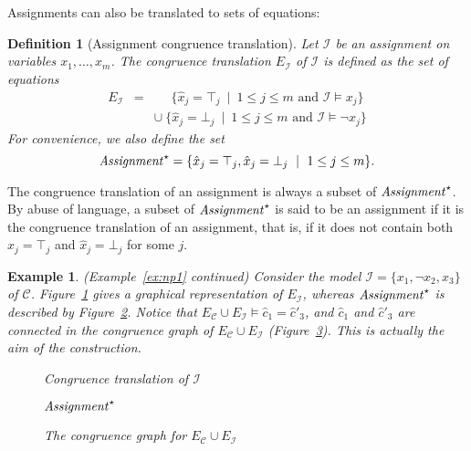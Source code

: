 \documentclass{easychair}
\newtheorem{example}{Example}
\newtheorem{definition}{Definition}
\begin{document}
Assignments can also be translated to sets of equations:
\begin{definition}[Assignment congruence translation]
Let $\mathcal{I}$ be an assignment on variables $x_1,\ldots,x_m$.
The congruence translation $E_{\mathcal{I}}$ of $\mathcal{I}$ is defined as the set of equations
\begin{eqnarray*}
  E_{\mathcal{I}} & = & \phantom{\cup}\ \{ \hat{x}_j = \top_j \ \mid\  1 \leq j \leq m \text{ and } \mathcal{I} \models x_j \} \\
               &   & \cup\ \{ \hat{x}_j = \bot_j \ \mid\ 1 \leq j \leq m \text{ and } \mathcal{I} \models \neg x_j \}
\end{eqnarray*}
For convenience, we also define the set
\begin{equation*}
  {\it Assignment}^\star = \{ \hat{x}_j = \top_j, \hat{x}_j = \bot_j \ \mid\ 1 \leq j \leq m\}.
\end{equation*}
\end{definition}
\noindent
The congruence translation of an assignment is always a subset of
${\it Assignment}^\star$.  By abuse of language, a subset of ${\it Assignment}^\star$ is
said to be an assignment if it is the congruence translation of an assignment,
that is, if it does not contain both $\hat{x}_j = \top_j$ and $\hat{x}_j =
\bot_j$ for some $j$.

\begin{example}\label{ex:np2} (Example~\ref{ex:np1} continued)  
Consider the model $\mathcal{I} = \{x_1, \neg x_2, x_3\}$ of\/ $\mathcal{C}$.
Figure~\ref{fig:npassignment} gives a graphical representation of
$E_{\mathcal{I}}$, whereas ${\it Assignment}^\star$ is described by
Figure~\ref{fig:npassignmentstar}.  Notice that
$E_{\mathcal{C}} \cup E_{\mathcal{I}} \models \hat{c}_1 = \hat{c}'_3$,
and $\hat{c}_1$ and $\hat{c}'_3$ are connected in the congruence graph
of $E_{\mathcal{C}} \cup E_{\mathcal{I}}$ (Figure~\ref{fig:npmodel}).
This is actually the aim of the construction.

\begin{figure}[ht]

\caption{Congruence translation of $\mathcal{I}$}
\label{fig:npassignment}
\end{figure}

\begin{figure}[ht]

\caption{${\it Assignment}^\star$}
\label{fig:npassignmentstar}
\end{figure}
\begin{figure}[ht]

\caption{The congruence graph for $E_{\mathcal{C}} \cup E_{\mathcal{I}}$}
\label{fig:npmodel}
\end{figure}
\end{example}
\end{document}
